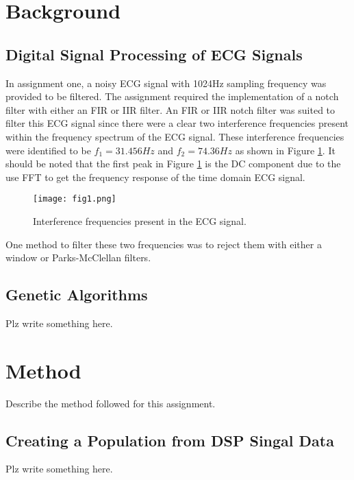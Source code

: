 \documentclass[a4paper, 11pt]{article}
\begin{document}
\section{Background}\label{sec:bg}
    \subsection{Digital Signal Processing of ECG Signals}\label{sec:bg_sub1}
        In assignment one, a noisy ECG signal with 1024Hz sampling frequency was provided to be filtered. 
        The assignment required the implementation of a notch filter with either an FIR or IIR filter.
        An FIR or IIR notch filter was suited to filter this ECG signal since there were a clear two 
        interference frequencies present within the frequency spectrum of the ECG signal.
        These interference frequencies were identified to be $f_{1} = 31.456Hz$ and $f_{2} = 74.36Hz$
        as shown in Figure \ref{Fig:fig1}. It should be noted that the first peak in Figure \ref{Fig:fig1} is the 
        DC component due to the use FFT to get the frequency response of the time domain ECG signal.
        
        \begin{figure}[h!]
            \centering
            \graphicspath{{./wiki/}}
            \texttt{[image: fig1.png]}
            \caption{Interference frequencies present in the ECG signal.}
            \label{Fig:fig1}
        \end{figure}

        One method to filter these two frequencies was to reject them with either a window or Parks-McClellan filters.

        
        
    \subsection{Genetic Algorithms}\label{sec:bg_sub2}
        Plz write something here.

\section{Method}\label{sec:meth}
    Describe the method followed for this assignment.
    \subsection{Creating a Population from DSP Singal Data}\label{sec:meth_sub1}
        Plz write something here.
\end{document}
